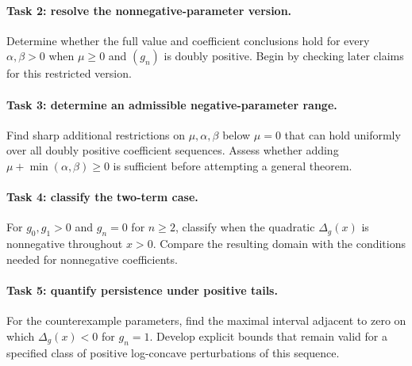\documentclass[11pt]{article}
\begin{document}
\clearpage
\paragraph{Task 2: resolve the nonnegative-parameter version.}
Determine whether the full value and coefficient conclusions hold for
every $\alpha,\beta>0$ when $\mu\ge0$ and $(g_n)$ is doubly positive.
Begin by checking later claims for this restricted version.

\paragraph{Task 3: determine an admissible negative-parameter range.}
Find sharp additional restrictions on $\mu,\alpha,\beta$ below
$\mu=0$ that can hold uniformly over all doubly positive coefficient
sequences. Assess whether adding $\mu+\min(\alpha,\beta)\ge0$
is sufficient before attempting a general theorem.

\paragraph{Task 4: classify the two-term case.}
For $g_0,g_1>0$ and $g_n=0$ for $n\ge2$, classify when the
quadratic $\Delta_g(x)$ is nonnegative throughout $x>0$.
Compare the resulting domain with the conditions needed for
nonnegative coefficients.

\paragraph{Task 5: quantify persistence under positive tails.}
For the counterexample parameters, find the maximal interval adjacent
to zero on which $\Delta_g(x)<0$ for $g_n=1$.
Develop explicit bounds that remain valid for a specified class of
positive log-concave perturbations of this sequence.
\end{document}
